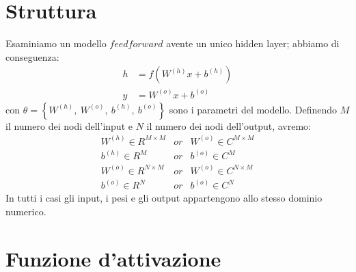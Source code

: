 \documentclass[a4paper,12pt]{report}
\begin{document}
 \section{Struttura}
 Esaminiamo un modello $feedforward$ avente un unico hidden layer; abbiamo di conseguenza:
 \begin{align}
  h &= f\left(W^{\left(h\right)}x+b^{\left(h\right)}\right)\\
  y &= W^{\left(o\right)}x+b^{\left(o\right)}
 \end{align}
 con $\theta = \left \{ W^{\left(h\right)}, \ W^{\left(o\right)}, \ b^{\left(h\right)}, \ b^{\left(o\right)}\right \}$ sono i parametri del modello. Definendo $M$ il numero dei nodi dell'input e $N$ il numero dei nodi dell'output, avremo:
 \begin{equation}
  \begin{matrix}
   W^{\left( h\right) } \in R^{M\times M} & or & W^{\left( o\right) } \in C^{M\times M}\\
   b^{\left( h\right) } \in R^M & or & b^{\left( o\right) } \in C^M\\
   W^{\left( o\right) } \in R^{N\times M} & or & W^{\left( o\right) } \in C^{N\times M}\\
   b^{\left( o\right) } \in R^N & or & b^{\left( o\right) } \in C^N
  \end{matrix}
 \end{equation}
 In tutti i casi gli input, i pesi e gli output appartengono allo stesso dominio numerico.
 
 \section{Funzione d'attivazione}
 
\end{document}
